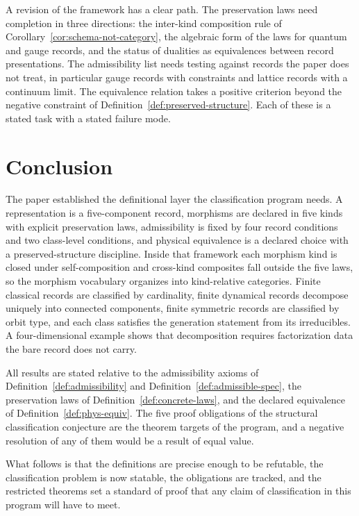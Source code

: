 \documentclass[11pt,letterpaper]{article}
\theoremstyle{definition}
\theoremstyle{remark}
\begin{document}
A revision of the framework has a clear path. The preservation laws need completion in three directions: the inter-kind composition rule of Corollary~\ref{cor:schema-not-category}, the algebraic form of the laws for quantum and gauge records, and the status of dualities as equivalences between record presentations. The admissibility list needs testing against records the paper does not treat, in particular gauge records with constraints and lattice records with a continuum limit. The equivalence relation takes a positive criterion beyond the negative constraint of Definition~\ref{def:preserved-structure}. Each of these is a stated task with a stated failure mode.

\section{Conclusion}
\label{sec:conclusion}

The paper established the definitional layer the classification program needs. A representation is a five-component record, morphisms are declared in five kinds with explicit preservation laws, admissibility is fixed by four record conditions and two class-level conditions, and physical equivalence is a declared choice with a preserved-structure discipline. Inside that framework each morphism kind is closed under self-composition and cross-kind composites fall outside the five laws, so the morphism vocabulary organizes into kind-relative categories. Finite classical records are classified by cardinality, finite dynamical records decompose uniquely into connected components, finite symmetric records are classified by orbit type, and each class satisfies the generation statement from its irreducibles. A four-dimensional example shows that decomposition requires factorization data the bare record does not carry.

All results are stated relative to the admissibility axioms of Definition~\ref{def:admissibility} and Definition~\ref{def:admissible-spec}, the preservation laws of Definition~\ref{def:concrete-laws}, and the declared equivalence of Definition~\ref{def:phys-equiv}. The five proof obligations of the structural classification conjecture are the theorem targets of the program, and a negative resolution of any of them would be a result of equal value.

What follows is that the definitions are precise enough to be refutable, the classification problem is now statable, the obligations are tracked, and the restricted theorems set a standard of proof that any claim of classification in this program will have to meet.
\end{document}
